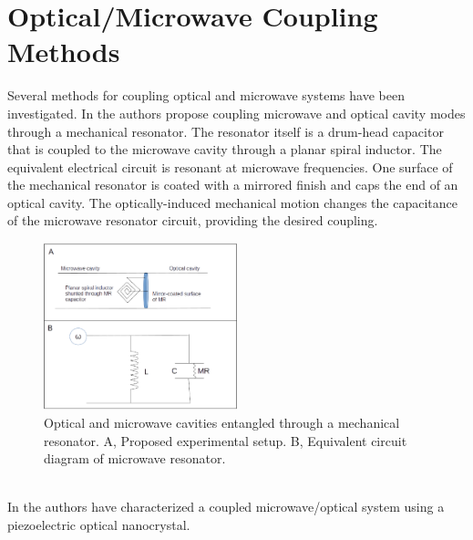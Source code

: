 \documentclass[a4paper,10pt,twocolumn]{article}
\numberwithin{equation}{section}
\begin{document}
\section{Optical/Microwave Coupling Methods}
Several methods for coupling optical and microwave systems have been investigated. 
In \cite{nanoMR} the authors propose coupling microwave and optical cavity modes through a mechanical resonator.
The resonator itself is a drum-head capacitor that is coupled to the microwave cavity through a planar spiral inductor. 
The equivalent electrical circuit is resonant at microwave frequencies.
One surface of the mechanical resonator is coated with a mirrored finish and caps the end of an optical cavity.
The optically-induced mechanical motion changes the capacitance of the microwave resonator circuit, providing the desired coupling.
\begin{figure}[ht]
 \caption{Optical and microwave cavities entangled through a mechanical resonator. A, Proposed experimental setup. B, Equivalent circuit diagram of microwave resonator.}
 \centering
   \includegraphics[width=0.5\textwidth]{f1}
\end{figure}
\\In \cite{nanoCrystal} the authors have characterized a coupled microwave/optical system using a piezoelectric optical nanocrystal.
\\
\end{document}
